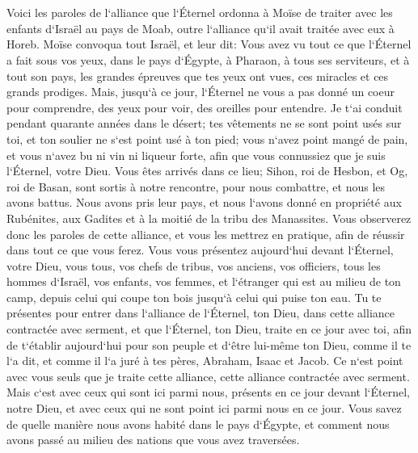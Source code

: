 \chapter{}

\verse Voici les paroles de l`alliance que l`Éternel ordonna à Moïse de traiter avec les enfants d`Israël au pays de Moab, outre l`alliance qu`il avait traitée avec eux à Horeb. 
\verse Moïse convoqua tout Israël, et leur dit: Vous avez vu tout ce que l`Éternel a fait sous vos yeux, dans le pays d`Égypte, à Pharaon, à tous ses serviteurs, et à tout son pays, 
\verse les grandes épreuves que tes yeux ont vues, ces miracles et ces grands prodiges. 
\verse Mais, jusqu`à ce jour, l`Éternel ne vous a pas donné un coeur pour comprendre, des yeux pour voir, des oreilles pour entendre. 
\verse Je t`ai conduit pendant quarante années dans le désert; tes vêtements ne se sont point usés sur toi, et ton soulier ne s`est point usé à ton pied; 
\verse vous n`avez point mangé de pain, et vous n`avez bu ni vin ni liqueur forte, afin que vous connussiez que je suis l`Éternel, votre Dieu. 
\verse Vous êtes arrivés dans ce lieu; Sihon, roi de Hesbon, et Og, roi de Basan, sont sortis à notre rencontre, pour nous combattre, et nous les avons battus. 
\verse Nous avons pris leur pays, et nous l`avons donné en propriété aux Rubénites, aux Gadites et à la moitié de la tribu des Manassites. 
\verse Vous observerez donc les paroles de cette alliance, et vous les mettrez en pratique, afin de réussir dans tout ce que vous ferez. 
\verse Vous vous présentez aujourd`hui devant l`Éternel, votre Dieu, vous tous, vos chefs de tribus, vos anciens, vos officiers, tous les hommes d`Israël, 
\verse vos enfants, vos femmes, et l`étranger qui est au milieu de ton camp, depuis celui qui coupe ton bois jusqu`à celui qui puise ton eau. 
\verse Tu te présentes pour entrer dans l`alliance de l`Éternel, ton Dieu, dans cette alliance contractée avec serment, et que l`Éternel, ton Dieu, traite en ce jour avec toi, 
\verse afin de t`établir aujourd`hui pour son peuple et d`être lui-même ton Dieu, comme il te l`a dit, et comme il l`a juré à tes pères, Abraham, Isaac et Jacob. 
\verse Ce n`est point avec vous seuls que je traite cette alliance, cette alliance contractée avec serment. 
\verse Mais c`est avec ceux qui sont ici parmi nous, présents en ce jour devant l`Éternel, notre Dieu, et avec ceux qui ne sont point ici parmi nous en ce jour. 
\verse Vous savez de quelle manière nous avons habité dans le pays d`Égypte, et comment nous avons passé au milieu des nations que vous avez traversées. 
